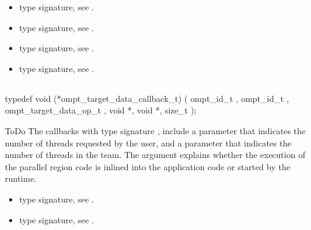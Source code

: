 \crossreferences
\begin{itemize}
\item {} type signature, see
.
\item {} type signature, see
.
\item {} type signature, see
.
\item {} type signature, see
.
\end{itemize}



\subsection{}
\label{subsec:ompt_target_data_callback_t}
\format
\begin{boxedcode}
typedef void (*ompt\_target\_data\_callback\_t) (
  ompt\_id\_t ,
  ompt\_id\_t ,
  ompt\_target\_data\_op\_t ,
  void *,
  void *,
  size\_t 
);
\end{boxedcode}
\descr ToDo
The callbacks with type signature ,
include a parameter 
that indicates the number of threads requested by the user, and a parameter
 that indicates the number of threads in the team.
The  argument explains whether the execution of the parallel
region code is inlined into the application code or started by the runtime.

\crossreferences
\begin{itemize}
\item {} type signature, see
.
\item {} type signature, see
.
\end{itemize}



